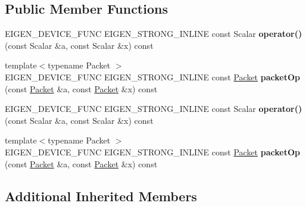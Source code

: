 \subsection*{Public Member Functions}
\begin{DoxyCompactItemize}
\item 
\mbox{\label{struct_eigen_1_1internal_1_1scalar__igamma__op_a4126518b0ae273ce2e7819a902741ed0}} 
E\+I\+G\+E\+N\+\_\+\+D\+E\+V\+I\+C\+E\+\_\+\+F\+U\+NC E\+I\+G\+E\+N\+\_\+\+S\+T\+R\+O\+N\+G\+\_\+\+I\+N\+L\+I\+NE const Scalar {\bfseries operator()} (const Scalar \&a, const Scalar \&x) const
\item 
\mbox{\label{struct_eigen_1_1internal_1_1scalar__igamma__op_a0e2d8db9dbfc5e2633039da7314d3c26}} 
{\footnotesize template$<$typename Packet $>$ }\\E\+I\+G\+E\+N\+\_\+\+D\+E\+V\+I\+C\+E\+\_\+\+F\+U\+NC E\+I\+G\+E\+N\+\_\+\+S\+T\+R\+O\+N\+G\+\_\+\+I\+N\+L\+I\+NE const \hyperlink{union_eigen_1_1internal_1_1_packet}{Packet} {\bfseries packet\+Op} (const \hyperlink{union_eigen_1_1internal_1_1_packet}{Packet} \&a, const \hyperlink{union_eigen_1_1internal_1_1_packet}{Packet} \&x) const
\item 
\mbox{\label{struct_eigen_1_1internal_1_1scalar__igamma__op_a4126518b0ae273ce2e7819a902741ed0}} 
E\+I\+G\+E\+N\+\_\+\+D\+E\+V\+I\+C\+E\+\_\+\+F\+U\+NC E\+I\+G\+E\+N\+\_\+\+S\+T\+R\+O\+N\+G\+\_\+\+I\+N\+L\+I\+NE const Scalar {\bfseries operator()} (const Scalar \&a, const Scalar \&x) const
\item 
\mbox{\label{struct_eigen_1_1internal_1_1scalar__igamma__op_a0e2d8db9dbfc5e2633039da7314d3c26}} 
{\footnotesize template$<$typename Packet $>$ }\\E\+I\+G\+E\+N\+\_\+\+D\+E\+V\+I\+C\+E\+\_\+\+F\+U\+NC E\+I\+G\+E\+N\+\_\+\+S\+T\+R\+O\+N\+G\+\_\+\+I\+N\+L\+I\+NE const \hyperlink{union_eigen_1_1internal_1_1_packet}{Packet} {\bfseries packet\+Op} (const \hyperlink{union_eigen_1_1internal_1_1_packet}{Packet} \&a, const \hyperlink{union_eigen_1_1internal_1_1_packet}{Packet} \&x) const
\end{DoxyCompactItemize}
\subsection*{Additional Inherited Members}



